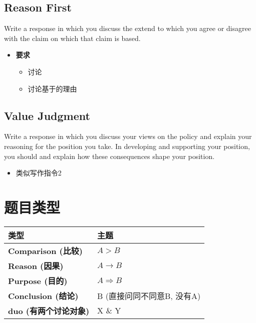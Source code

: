   \subsection{Reason First}

    Write a response in which you discuss the extend to which you agree or
    disagree with the claim  on which that claim
    is based.

    \begin{itemize}
      \item \textbf{要求}
      \begin{itemize}
        \item 讨论
        \item 讨论基于的理由
      \end{itemize}
    \end{itemize}

  \subsection{Value Judgment}

    Write a response in which you discuss your views on the policy and
    explain your reasoning for the position you take. In developing and
    supporting your position, you should  and explain how these
    consequences shape your position.

    \begin{itemize}
      \item 类似写作指令2
    \end{itemize}

\section{题目类型}

  \begin{tabu} to \columnwidth{| X[1, c] | X[1, c] |}
    \hline
    \textbf{类型} & \textbf{主题} \\ \hline
    \textbf{Comparison (比较)} & $ A > B $ \\ \hline
    \textbf{Reason (因果)} & $ A \rightarrow B $ \\ \hline
    \textbf{Purpose (目的)} & $ A \Rightarrow B $ \\ \hline
    \textbf{Conclusion (结论)} & B (直接问同不同意B, 没有A) \\ \hline
    \textbf{duo (有两个讨论对象)} & X \& Y \\ \hline
  \end{tabu}

